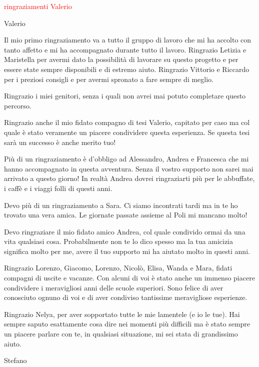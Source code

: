 \textcolor{red}{ringraziamenti Valerio}

\vspace{1cm}

\begin{flushright}
	Valerio
\end{flushright}

\clearpage

Il mio primo ringraziamento va a tutto il gruppo di lavoro che mi ha accolto con tanto affetto e mi ha accompagnato durante tutto il lavoro. Ringrazio Letizia e Maristella per avermi dato la possibilità di lavorare su questo progetto e per essere state sempre disponibili e di estremo aiuto. Ringrazio Vittorio e Riccardo per i preziosi consigli e per avermi spronato a fare sempre di meglio. 

Ringrazio i miei genitori, senza i quali non avrei mai potuto completare questo percorso.

Ringrazio anche il mio fidato compagno di tesi Valerio, capitato per caso ma col quale è stato veramente un piacere condividere questa esperienza. Se questa tesi sarà un successo è anche merito tuo!

Più di un ringraziamento è d’obbligo ad Alessandro, Andrea e Francesca che mi hanno accompagnato in questa avventura. Senza il vostro supporto non sarei mai arrivato a questo giorno! In realtà Andrea dovrei ringraziarti più per le abbuffate, i caffè e i viaggi folli di questi anni.

Devo più di un ringraziamento a Sara. Ci siamo incontrati tardi ma in te ho trovato una vera amica. Le giornate passate assieme al Poli mi mancano molto!

Devo ringraziare il mio fidato amico Andrea, col quale condivido ormai da una vita qualsiasi cosa. Probabilmente non te lo dico spesso ma la tua amicizia significa molto per me, avere il tuo supporto mi ha aiutato molto in questi anni.

Ringrazio Lorenzo, Giacomo, Lorenzo, Nicolò, Elisa, Wanda e Mara, fidati compagni di uscite e vacanze. Con alcuni di voi è stato anche un immenso piacere condividere i meravigliosi anni delle scuole superiori. Sono felice di aver conosciuto ognuno di voi e di aver condiviso tantissime meravigliose esperienze.

Ringrazio Nelya, per aver sopportato tutte le mie lamentele (e io le tue). Hai sempre saputo esattamente cosa dire nei momenti più difficili ma è stato sempre un piacere parlare con te, in qualsiasi situazione, mi sei stata di grandissimo aiuto.

\vspace{1cm}

\begin{flushright}
	Stefano
\end{flushright}